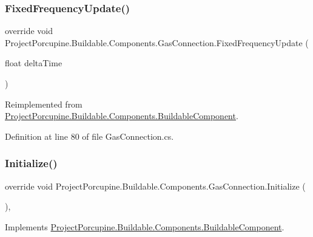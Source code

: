 \subsubsection{\texorpdfstring{Fixed\+Frequency\+Update()}{FixedFrequencyUpdate()}}
{\footnotesize\ttfamily override void Project\+Porcupine.\+Buildable.\+Components.\+Gas\+Connection.\+Fixed\+Frequency\+Update (\begin{DoxyParamCaption}\item[{float}]{delta\+Time }\end{DoxyParamCaption})\hspace{0.3cm}{\ttfamily [virtual]}}



Reimplemented from \hyperlink{class_project_porcupine_1_1_buildable_1_1_components_1_1_buildable_component_a0528e50f3dbe24481256802e758deeb9}{Project\+Porcupine.\+Buildable.\+Components.\+Buildable\+Component}.



Definition at line 80 of file Gas\+Connection.\+cs.

\mbox{\label{class_project_porcupine_1_1_buildable_1_1_components_1_1_gas_connection_a1eab83807e81517d9defd25ab97bf9a0}} 
\subsubsection{\texorpdfstring{Initialize()}{Initialize()}}
{\footnotesize\ttfamily override void Project\+Porcupine.\+Buildable.\+Components.\+Gas\+Connection.\+Initialize (\begin{DoxyParamCaption}{ }\end{DoxyParamCaption})\hspace{0.3cm}{\ttfamily [protected]}, {\ttfamily [virtual]}}



Implements \hyperlink{class_project_porcupine_1_1_buildable_1_1_components_1_1_buildable_component_ac3050db5e9d240e7618ce156920a9dc6}{Project\+Porcupine.\+Buildable.\+Components.\+Buildable\+Component}.



